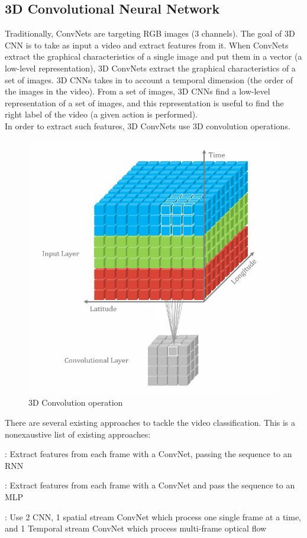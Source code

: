 \documentclass{report}
\begin{document}
\subsection{3D Convolutional Neural Network}
Traditionally, ConvNets are targeting RGB images (3 channels). The goal of 3D CNN is to take as input a video and extract features from it.
When ConvNets extract the graphical characteristics of a single image and put them in a vector (a low-level representation), 3D ConvNets
extract the graphical characteristics of a set of images. 3D CNNs takes in to account a temporal dimension (the order of the images in the
video). From a set of images, 3D CNNs find a low-level representation of a set of images, and this representation is useful to find the
right label of the video (a given action is performed). \\
In order to extract such features, 3D ConvNets  use 3D convolution operations.
\begin{figure}[h]
  \centering
  \includegraphics[scale=0.3]{3d_conv}
  \caption{3D Convolution operation}
\end{figure}

There are several existing approaches to tackle the video classification. This is a nonexaustive list of existing approaches:
\begin{description} [font=$\bullet$\scshape\bfseries]
\item[ ConvNets + LSTM cell] : Extract features from each frame with a ConvNet, passing the sequence to an RNN
\item[ Temporal Relation Networks] : Extract features from each frame with a ConvNet and pass the sequence to an MLP
\item[ Two-Stream Convolutional Networks] : Use 2 CNN, 1 spatial stream ConvNet which process one single frame at a time, and 1 Temporal stream ConvNet which process multi-frame optical flow
\end{description}
\end{document}
